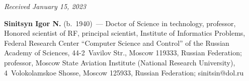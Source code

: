 \vspace*{-6pt}

\hfill{\small\textit{Received January 15, 2023}} 


\Contrl

\noindent
\textbf{Sinitsyn Igor N.} (b.\ 1940)~--- 
Doctor of Science in technology, professor, Honored scientist of RF, principal scientist, Institute of Informatics Problems, Federal Research Center 
``Computer Science and Control'' of the Russian Academy of Sciences, 44-2~Vavilov Str., Moscow 119333, Russian Federation; 
professor, Moscow State Aviation Institute (National Research University), 4~Volokolamskoe Shosse, Moscow 125933, Russian Federation; \mbox{sinitsin@dol.ru}


   
\label{end\stat}

\renewcommand{\bibname}{\protect\rm Литература} 